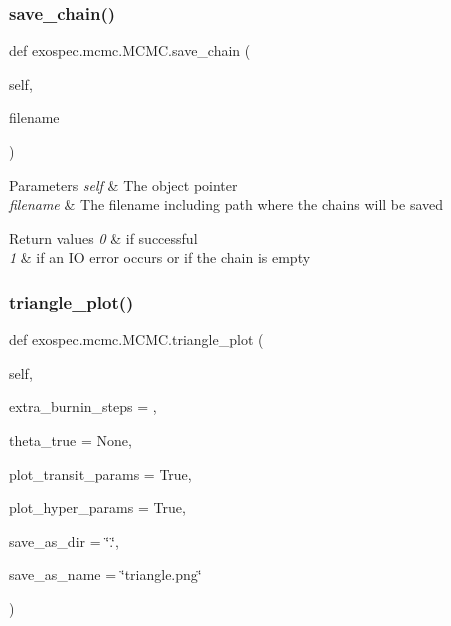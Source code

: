 \subsubsection{\texorpdfstring{save\+\_\+chain()}{save\_chain()}}
{\footnotesize\ttfamily def exospec.\+mcmc.\+M\+C\+M\+C.\+save\+\_\+chain (\begin{DoxyParamCaption}\item[{}]{self,  }\item[{}]{filename }\end{DoxyParamCaption})}


\begin{DoxyParams}{Parameters}
{\em self} & The object pointer \\
\hline
{\em filename} & The filename including path where the chains will be saved \\
\hline
\end{DoxyParams}

\begin{DoxyRetVals}{Return values}
{\em 0} & if successful \\
\hline
{\em 1} & if an IO error occurs or if the chain is empty \\
\hline
\end{DoxyRetVals}
\mbox{\label{classexospec_1_1mcmc_1_1_m_c_m_c_af240e8deac4470da704239926ea56822}} 
\subsubsection{\texorpdfstring{triangle\+\_\+plot()}{triangle\_plot()}}
{\footnotesize\ttfamily def exospec.\+mcmc.\+M\+C\+M\+C.\+triangle\+\_\+plot (\begin{DoxyParamCaption}\item[{}]{self,  }\item[{}]{extra\+\_\+burnin\+\_\+steps = {},  }\item[{}]{theta\+\_\+true = {\ttfamily None},  }\item[{}]{plot\+\_\+transit\+\_\+params = {\ttfamily True},  }\item[{}]{plot\+\_\+hyper\+\_\+params = {\ttfamily True},  }\item[{}]{save\+\_\+as\+\_\+dir = {\ttfamily \char`\"{}.\char`\"{}},  }\item[{}]{save\+\_\+as\+\_\+name = {\ttfamily \char`\"{}triangle.png\char`\"{}} }\end{DoxyParamCaption})}

